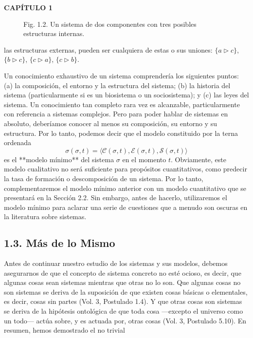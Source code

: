 \newpage

\fancyhf{}
\fancyhead[l]{\thepage}
\begin{center}
{\fontsize{13}{16}\selectfont \textbf{CAPÍTULO 1}}
\end{center}
\vspace{0.5cm}

{\fontsize{13}{15}\selectfont
\begin{figure}[h!]
    \centering
    \caption*{Fig. 1.2. Un sistema de dos componentes con tres posibles estructuras internas.}
\end{figure}
las estructuras externas, pueden ser cualquiera de estas o sus uniones: $\{a \triangleright c\}$, $\{b \triangleright c\}$, $\{c \triangleright a\}$, $\{c \triangleright b\}$.

Un conocimiento exhaustivo de un sistema comprendería los siguientes puntos: (a) la composición, el entorno y la estructura del sistema; (b) la historia del sistema (particularmente si es un biosistema o un sociosistema); y (c) las leyes del sistema. Un conocimiento tan completo rara vez es alcanzable, particularmente con referencia a sistemas complejos. Pero para poder hablar de sistemas en absoluto, deberíamos conocer al menos su composición, su entorno y su estructura. Por lo tanto, podemos decir que el modelo constituido por la terna ordenada
$$ \sigma(\sigma, t) = \langle \mathcal{C}(\sigma, t), \mathcal{E}(\sigma, t), \mathcal{S}(\sigma, t) \rangle $$
es el **modelo mínimo** del sistema $\sigma$ en el momento $t$. Obviamente, este modelo cualitativo no será suficiente para propósitos cuantitativos, como predecir la tasa de formación o descomposición de un sistema. Por lo tanto, complementaremos el modelo mínimo anterior con un modelo cuantitativo que se presentará en la Sección 2.2. Sin embargo, antes de hacerlo, utilizaremos el modelo mínimo para aclarar una serie de cuestiones que a menudo son oscuras en la literatura sobre sistemas.

\subsection*{1.3. Más de lo Mismo}
Antes de continuar nuestro estudio de los sistemas y sus modelos, debemos asegurarnos de que el concepto de sistema concreto no esté ocioso, es decir, que algunas cosas sean sistemas mientras que otras no lo son. Que algunas cosas no son sistemas se deriva de la suposición de que existen cosas básicas o elementales, es decir, cosas sin partes (Vol. 3, Postulado 1.4). Y que otras cosas son sistemas se deriva de la hipótesis ontológica de que toda cosa —excepto el universo como un todo— actúa sobre, y es actuada por, otras cosas (Vol. 3, Postulado 5.10). En resumen, hemos demostrado el no trivial

}
